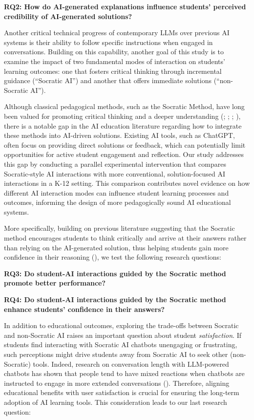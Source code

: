 \documentclass[
  12pt,
]{article}
\begin{document}
\textbf{RQ2: How do AI-generated explanations influence students' perceived credibility of AI-generated solutions?}

Another critical technical progress of contemporary LLMs over previous AI systems is their ability to follow specific instructions when engaged in conversations. Building on this capability, another goal of this study is to examine the impact of two fundamental modes of interaction on students' learning outcomes: one that fosters critical thinking through incremental guidance (``Socratic AI'') and another that offers immediate solutions (``non-Socratic AI'').

Although classical pedagogical methods, such as the Socratic Method, have long been valued for promoting critical thinking and a deeper understanding (; ; ; ), there is a notable gap in the AI education literature regarding how to integrate these methods into AI-driven solutions. Existing AI tools, such as ChatGPT, often focus on providing direct solutions or feedback, which can potentially limit opportunities for active student engagement and reflection. Our study addresses this gap by conducting a parallel experimental intervention that compares Socratic-style AI interactions with more conventional, solution-focused AI interactions in a K-12 setting. This comparison contributes novel evidence on how different AI interaction modes can influence student learning processes and outcomes, informing the design of more pedagogically sound AI educational systems.

More specifically, building on previous literature suggesting that the Socratic method encourages students to think critically and arrive at their answers rather than relying on the AI-generated solution, thus helping students gain more confidence in their reasoning (), we test the following research questions:

\textbf{RQ3: Do student-AI interactions guided by the Socratic method promote better performance?}

\textbf{RQ4: Do student-AI interactions guided by the Socratic method enhance students' confidence in their answers?}

In addition to educational outcomes, exploring the trade-offs between Socratic and non-Socratic AI raises an important question about student \emph{satisfaction}. If students find interacting with Socratic AI chatbots unengaging or frustrating, such perceptions might drive students away from Socratic AI to seek other (non-Socratic) tools. Indeed, research on conversation length with LLM-powered chatbots has shown that people tend to have mixed reactions when chatbots are instructed to engage in more extended conversations (). Therefore, aligning educational benefits with user satisfaction is crucial for ensuring the long-term adoption of AI learning tools. This consideration leads to our last research question:
\end{document}
